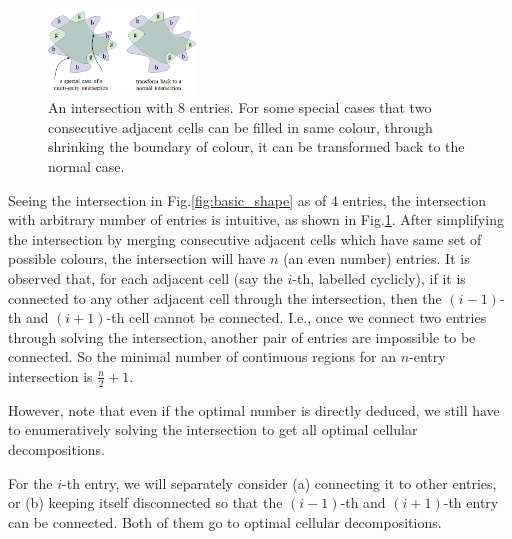 \documentclass[conference]{IEEEtran}
\begin{document}
\begin{figure}[t]
\centering
\includegraphics[width = 0.35\textwidth]{figures/multi_entry}
\caption{An intersection with $8$ entries. For some special cases that two consecutive adjacent cells can be filled in same colour, through shrinking the boundary of colour, it can be transformed back to the normal case. }\label{fig:multi_entry}
\end{figure}
Seeing the intersection in Fig.\ref{fig:basic_shape} as of $4$ entries, the intersection with arbitrary number of entries is intuitive, as shown in Fig.\ref{fig:multi_entry}. After simplifying the intersection by merging consecutive adjacent cells which have same set of possible colours, the intersection will have $n$ (an even number) entries. 
It is observed that, for each adjacent cell (say the $i$-th, labelled cyclicly), if it is connected to any other adjacent cell through the intersection, then the $(i-1)$-th and $(i+1)$-th cell cannot be connected. 
I.e., once we connect two entries through solving the intersection, another pair of entries are impossible to be connected. 
So the minimal number of continuous regions for an $n$-entry intersection is $\frac{n}{2}+1$. 


However, note that even if the optimal number is directly deduced, we still have to enumeratively solving the intersection to get all optimal cellular decompositions. 

For the $i$-th entry, we will separately consider (a) connecting it to other entries, or (b) keeping itself disconnected so that the $(i-1)$-th and $(i+1)$-th entry can be connected. Both of them go to optimal cellular decompositions. 
\end{document}
